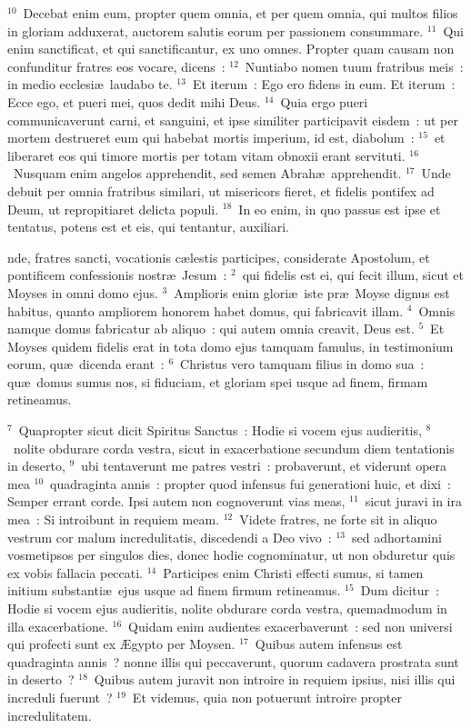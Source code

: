 ${}^{10}$~Decebat enim eum, propter quem omnia, et per quem omnia, qui multos filios in gloriam adduxerat, auctorem salutis eorum per passionem consummare.
${}^{11}$~Qui enim sanctificat, et qui sanctificantur, ex uno omnes. Propter quam causam non confunditur fratres eos vocare, dicens~:
${}^{12}$~Nuntiabo nomen tuum fratribus meis~: in medio ecclesi\ae\ laudabo te.
${}^{13}$~Et iterum~: Ego ero fidens in eum. Et iterum~: Ecce ego, et pueri mei, quos dedit mihi Deus.
${}^{14}$~Quia ergo pueri communicaverunt carni, et sanguini, et ipse similiter participavit eisdem~: ut per mortem destrueret eum qui habebat mortis imperium, id est, diabolum~:
${}^{15}$~et liberaret eos qui timore mortis per totam vitam obnoxii erant servituti.
${}^{16}$~Nusquam enim angelos apprehendit, sed semen Abrah\ae\ apprehendit.
${}^{17}$~Unde debuit per omnia fratribus similari, ut misericors fieret, et fidelis pontifex ad Deum, ut repropitiaret delicta populi.
${}^{18}$~In eo enim, in quo passus est ipse et tentatus, potens est et eis, qui tentantur, auxiliari.

\bchapter
{}nde, fratres sancti, vocationis c\ae lestis participes, considerate Apostolum, et pontificem confessionis nostr\ae\ Jesum~:
${}^{2}$~qui fidelis est ei, qui fecit illum, sicut et Moyses in omni domo ejus.
${}^{3}$~Amplioris enim glori\ae\ iste pr\ae\ Moyse dignus est habitus, quanto ampliorem honorem habet domus, qui fabricavit illam.
${}^{4}$~Omnis namque domus fabricatur ab aliquo~: qui autem omnia creavit, Deus est.
${}^{5}$~Et Moyses quidem fidelis erat in tota domo ejus tamquam famulus, in testimonium eorum, qu\ae\ dicenda erant~:
${}^{6}$~Christus vero tamquam filius in domo sua~: qu\ae\ domus sumus nos, si fiduciam, et gloriam spei usque ad finem, firmam retineamus.


${}^{7}$~Quapropter sicut dicit Spiritus Sanctus~: Hodie si vocem ejus audieritis,
${}^{8}$~nolite obdurare corda vestra, sicut in exacerbatione secundum diem tentationis in deserto,
${}^{9}$~ubi tentaverunt me patres vestri~: probaverunt, et viderunt opera mea
${}^{10}$~quadraginta annis~: propter quod infensus fui generationi huic, et dixi~: Semper errant corde. Ipsi autem non cognoverunt vias meas,
${}^{11}$~sicut juravi in ira mea~: Si introibunt in requiem meam.
${}^{12}$~Videte fratres, ne forte sit in aliquo vestrum cor malum incredulitatis, discedendi a Deo vivo~:
${}^{13}$~sed adhortamini vosmetipsos per singulos dies, donec hodie cognominatur, ut non obduretur quis ex vobis fallacia peccati.
${}^{14}$~Participes enim Christi effecti sumus, si tamen initium substanti\ae\ ejus usque ad finem firmum retineamus.
${}^{15}$~Dum dicitur~: Hodie si vocem ejus audieritis, nolite obdurare corda vestra, quemadmodum in illa exacerbatione.
${}^{16}$~Quidam enim audientes exacerbaverunt~: sed non universi qui profecti sunt ex \AE gypto per Moysen.
${}^{17}$~Quibus autem infensus est quadraginta annis~? nonne illis qui peccaverunt, quorum cadavera prostrata sunt in deserto~?
${}^{18}$~Quibus autem juravit non introire in requiem ipsius, nisi illis qui increduli fuerunt~?
${}^{19}$~Et videmus, quia non potuerunt introire propter incredulitatem.


